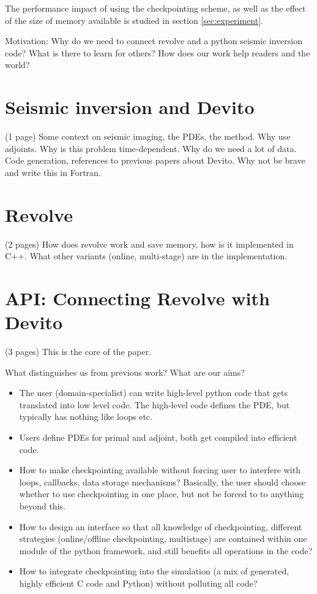 \documentclass[sigconf]{acmart}
\begin{document}
The performance impact of using the checkpointing scheme, as well as
the effect of the size of memory available is studied in section
\ref{sec:experiment}. 

Motivation: Why do we need to connect revolve and a python seismic inversion code? What is there to
learn for others? How does our work help readers and the world?

\section{Seismic inversion and Devito}
(1 page)
\label{sec:inversion_devito}
Some context on seismic imaging, the PDEs, the method. Why use
adjoints. Why is this problem time-dependent. Why do we need a lot of
data.
Code generation, references to previous papers about Devito. Why not
be brave and write this in Fortran.

\section{Revolve}
(2 pages)
\label{sec:revolve}
How does revolve work and save memory, how is it implemented in C++. What other variants (online,
multi-stage) are in the implementation.

\section{API: Connecting Revolve with Devito}
(3 pages)
\label{sec:api}
This is the core of the paper.

What distinguishes us from previous work? What are our aims?
\begin{itemize}
\item The user (domain-specialist) can write high-level python code that gets translated into low
level code. The high-level code defines the PDE, but typically has nothing like loops etc.
\item Users define PDEs for primal and adjoint, both get compiled into efficient code.
\item How to make checkpointing available without forcing user to interfere with loops, callbacks,
data storage mechanisms? Basically, the user should choose whether to use checkpointing in one
place, but not be forced to to anything beyond this.
\item How to design an interface so that all knowledge of checkpointing, different strategies
(online/offline checkpointing, multistage) are contained within one module of the python framework,
and still benefits all operations in the code?
\item How to integrate checkpointing into the simulation (a mix of generated, highly efficient C
code and Python) without polluting all code?
\end{itemize}
\end{document}

